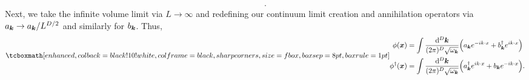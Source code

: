 {\begin{align}
.\end{align}
Next, we take the infinite volume limit via $L \rightarrow \infty$ and redefining our continuum limit creation and annihilation operators via $a_{\vb*{k}} \rightarrow a_{\vb*{k}} / L^{D/2}$ and similarly for $b_{\vb*{k}}$.
Thus,
\begin{align}
\eqbox{
\begin{aligned} 
    \phi(\vb*{x}) &= \int \frac{\dd[D]{\vb*{k}}}{(2 \pi)^{D} \sqrt{\omega_{\vb*{k}}}} \Big( a_{\vb*{k}} e^{-i k \cdot x} + b_{\vb*{k}}^{\dagger} e^{i k \cdot x} \Big) \\
    \phi^{\dagger}(\vb*{x}) &= \int \frac{\dd[D]{\vb*{k}}}{(2 \pi)^{D} \sqrt{\omega_{\vb*{k}}}} \Big( a_{\vb*{k}}^{\dagger} e^{i k \cdot x} + b_{\vb*{k}} e^{-i k \cdot x} \Big)
.\end{aligned}
}
\end{align}

}


